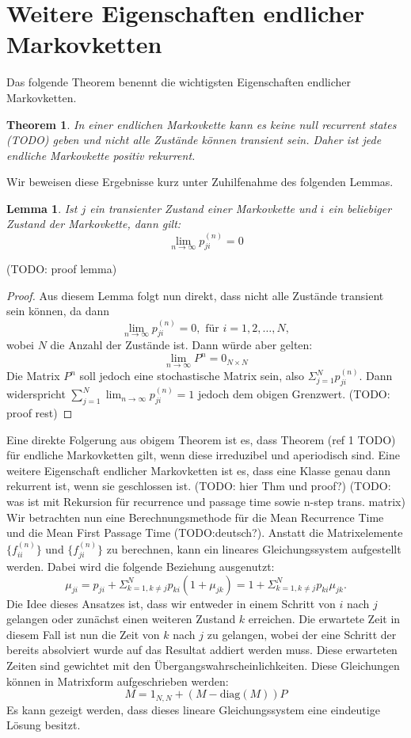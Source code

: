 \documentclass{article}
\newtheorem{thm}{Theorem}
\newtheorem{lemma}{Lemma}
\begin{document}
\section{Weitere Eigenschaften endlicher Markovketten}
Das folgende Theorem benennt die wichtigsten Eigenschaften endlicher
Markovketten.
\begin{thm}
In einer endlichen Markovkette kann es keine
null recurrent states (TODO) geben und nicht alle Zustände
können transient sein. Daher ist jede endliche Markovkette positiv
rekurrent.  
\end{thm}
Wir beweisen diese Ergebnisse kurz unter Zuhilfenahme des folgenden
Lemmas.
\begin{lemma}
  Ist $j$ ein transienter Zustand einer Markovkette und $i$ ein
  beliebiger Zustand der Markovkette, dann gilt:
  \[
    \lim_{n→∞} p_{ji}^{(n)} = 0
  \]
\end{lemma}
(TODO: proof lemma)
\begin{proof}
Aus diesem Lemma folgt nun direkt, dass nicht alle Zustände transient
sein können, da dann
\[
  \lim_{n→∞} p_{ji}^{(n)} = 0, \text{ für } i = 1,2,\dots,N,
\]
wobei $N$ die Anzahl der Zustände ist. Dann würde aber gelten:
\[
  \lim_{n→∞} P^n = 0_{N×N}
\]
Die Matrix $P^n$ soll jedoch eine stochastische Matrix sein, also
$Σ_{j=1}^Np_{ji}^{(n)}$. Dann widerspricht $\sum_{j=1}^N \lim_{n→∞}
p_{ji}^{(n)} = 1$ jedoch dem obigen Grenzwert.
(TODO: proof rest)
\end{proof}
Eine direkte Folgerung aus obigem Theorem ist es, dass Theorem (ref 1
TODO) für endliche Markovketten gilt, wenn diese irreduzibel und
aperiodisch sind.
Eine weitere Eigenschaft endlicher Markovketten ist es, dass eine
Klasse genau dann rekurrent ist, wenn sie geschlossen ist.
(TODO: hier Thm und proof?)
(TODO: was ist mit Rekursion für recurrence und passage time sowie
n-step trans. matrix)
Wir betrachten nun eine Berechnungsmethode für die Mean Recurrence Time und die Mean First Passage Time (TODO:deutsch?). Anstatt die Matrixelemente $\{f_{ii}^{(n)}\}$ und $\{f_{ji}^{(n)}\}$ zu berechnen, kann ein lineares Gleichungssystem aufgestellt werden. Dabei wird die folgende Beziehung ausgenutzt:
\[
  μ_{ji} = p_{ji} + Σ_{k=1,k≠j}^Np_{ki}(1+μ_{jk}) = 1+Σ_{k=1,k≠j}^Np_{ki}μ_{jk}.
\]
Die Idee dieses Ansatzes ist, dass wir entweder in einem Schritt von $i$ nach $j$ gelangen oder zunächst einen weiteren Zustand $k$ erreichen. Die erwartete Zeit in diesem Fall ist nun die Zeit von $k$ nach $j$ zu gelangen, wobei der eine Schritt der bereits absolviert wurde auf das Resultat addiert werden muss. Diese erwarteten Zeiten sind gewichtet mit den Übergangswahrscheinlichkeiten. Diese Gleichungen können in Matrixform aufgeschrieben werden:
\[
  M = 1_{N,N} + (M - \text{diag}(M))P
\]
Es kann gezeigt werden, dass dieses lineare Gleichungssystem eine eindeutige Lösung besitzt.
\end{document}
